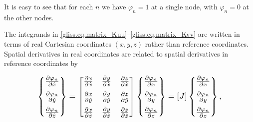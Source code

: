 \noindent
It is easy to see that for each $n$ we have $\varphi_n = 1$ at a single node, with $\varphi_n = 0$ at the other nodes.

The integrands in \eqref{gliss.eq.matrix_Kuu}--\eqref{gliss.eq.matrix_Kvv} 
are written in terms of real Cartesian coordinates $(x,y,z)$ rather than reference coordinates. 
Spatial derivatives in real coordinates are related to spatial derivatives in reference coordinates by

\begin{equation}
  \label{gliss.eq.real_to_reference}
  \scalebox{1.2}{
    $
  \left\{ \begin{matrix}
    \frac{\partial {{\varphi }_{n}}}{\partial \hat{x}}  \\[6pt]
    \frac{\partial {{\varphi }_{n}}}{\partial \hat{y}}  \\[6pt]
    \frac{\partial {{\varphi }_{n}}}{\partial \hat{z}}  \\
  \end{matrix} \right\} = 
  \left[ \begin{matrix}
      \frac{\partial x}{\partial \hat{x}} & \frac{\partial y}{\partial \hat{x}} & \frac{\partial z}{\partial \hat{x}}  \\[6pt]
      \frac{\partial x}{\partial \hat{y}} & \frac{\partial y}{\partial \hat{y}} & \frac{\partial z}{\partial \hat{y}}  \\[6pt]
      \frac{\partial x}{\partial \hat{z}} & \frac{\partial y}{\partial \hat{z}} & \frac{\partial z}{\partial \hat{z}}  \\
    \end{matrix} \right]
  \left\{ \begin{matrix}
    \frac{\partial {{\varphi }_{n}}}{\partial x}  \\[6pt]
    \frac{\partial {{\varphi }_{n}}}{\partial y}  \\[6pt]
    \frac{\partial {{\varphi }_{n}}}{\partial z}  \\
  \end{matrix} \right\} =
   [J]\left\{ \begin{matrix}
     \frac{\partial {{\varphi }_{n}}}{\partial x}  \\[6pt]
     \frac{\partial {{\varphi }_{n}}}{\partial y}  \\[6pt]
     \frac{\partial {{\varphi }_{n}}}{\partial z}  \\
   \end{matrix} \right\},
   $
  }
\end{equation}

